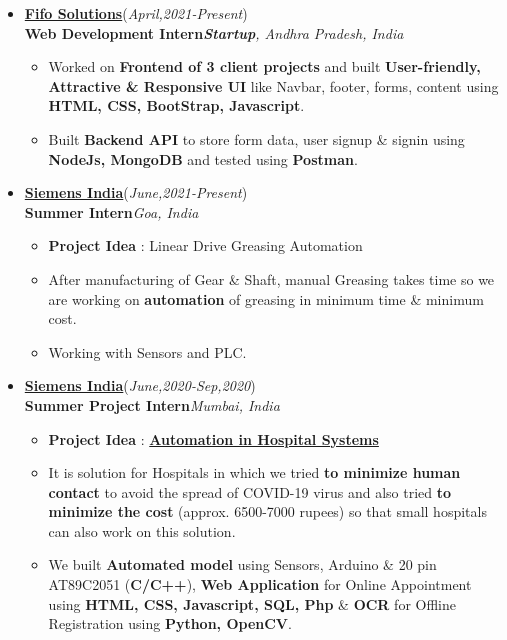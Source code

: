 \documentclass[10pt]{extarticle}
\begin{document}
\begin{itemize}
\item \href{https://www.linkedin.com/company/fifo-solutions/}{\textbf{Fifo Solutions}}\hfill\hfill(\textit{April,2021-Present})\\
\textbf{Web Development Intern}\hfill\hfill\textit{\textbf{Startup}, Andhra Pradesh, India}
    \begin{itemize}
        \item Worked on \textbf{Frontend of 3 client projects} and built \textbf{User-friendly, Attractive \& Responsive UI} like Navbar, footer, forms, content using \textbf{HTML, CSS, BootStrap, Javascript}.
        \item Built \textbf{Backend API} to store form data, user signup \& signin using \textbf{NodeJs, MongoDB} and tested using \textbf{Postman}.
    \end{itemize}
\item \href{http://www.siemens.com/}{\textbf{Siemens India}}\hfill\hfill(\textit{June,2021-Present})\\
\textbf{Summer Intern}\hfill\hfill\textit{Goa, India}
     \begin{itemize}
         \item \textbf{Project Idea} : Linear Drive Greasing Automation
         \item After manufacturing of Gear \& Shaft, manual Greasing takes time so we are working on \textbf{automation} of greasing in minimum time \& minimum cost.
         \item Working with Sensors and PLC.
     \end{itemize}
\item \href{http://www.siemens.com/}{\textbf{Siemens India}}\hfill\hfill(\textit{June,2020-Sep,2020})\\
\textbf{Summer Project Intern}\hfill\hfill\textit{Mumbai, India}
      \begin{itemize}
          \item \textbf{Project Idea} : \href{https://github.com/PSoni8/Automation-in-Hospital-Systems}{\textbf{Automation in Hospital Systems}}
          \item It is solution for Hospitals in which we tried \textbf{to minimize human contact} to avoid the spread of COVID-19 virus and also tried \textbf{to minimize the cost} (approx. 6500-7000 rupees) so that small hospitals can also work on this solution.
          \item We built \textbf{Automated model} using Sensors, Arduino \& 20 pin AT89C2051 (\textbf{C/C++}), \textbf{Web Application} for Online Appointment using \textbf{ HTML, CSS, Javascript, SQL, Php} \& \textbf{OCR} for Offline Registration using \textbf{Python, OpenCV}.
      \end{itemize}
\end{itemize}
\end{document}
